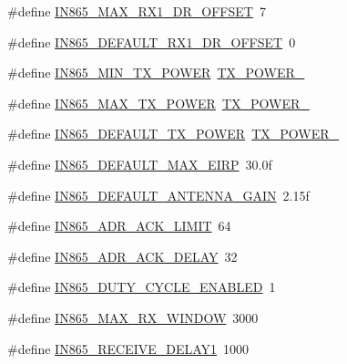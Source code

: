 \begin{DoxyCompactItemize}
\item 
\#define \hyperlink{group__REGIONIN865_ga3211339c60a66ca9f9baad03eb4546d6}{I\+N865\+\_\+\+M\+A\+X\+\_\+\+R\+X1\+\_\+\+D\+R\+\_\+\+O\+F\+F\+S\+ET}~7
\item 
\#define \hyperlink{group__REGIONIN865_ga6bd4f0c33ab266e3e197db4f45131cae}{I\+N865\+\_\+\+D\+E\+F\+A\+U\+L\+T\+\_\+\+R\+X1\+\_\+\+D\+R\+\_\+\+O\+F\+F\+S\+ET}~0
\item 
\#define \hyperlink{group__REGIONIN865_ga91b8f9bdc09d452a2e6bbbad95544245}{I\+N865\+\_\+\+M\+I\+N\+\_\+\+T\+X\+\_\+\+P\+O\+W\+ER}~\hyperlink{group__REGION_gac9747c69350f34d485c3134e5a57655b}{T\+X\+\_\+\+P\+O\+W\+E\+R\+\_}
\item 
\#define \hyperlink{group__REGIONIN865_ga6bd515d7c4fbad47210702da1d9396a3}{I\+N865\+\_\+\+M\+A\+X\+\_\+\+T\+X\+\_\+\+P\+O\+W\+ER}~\hyperlink{group__REGION_gab33618449f2a573142c463ab071ef8ed}{T\+X\+\_\+\+P\+O\+W\+E\+R\+\_}
\item 
\#define \hyperlink{group__REGIONIN865_gafdbc3865fbf7785cdee80410d5769f84}{I\+N865\+\_\+\+D\+E\+F\+A\+U\+L\+T\+\_\+\+T\+X\+\_\+\+P\+O\+W\+ER}~\hyperlink{group__REGION_gab33618449f2a573142c463ab071ef8ed}{T\+X\+\_\+\+P\+O\+W\+E\+R\+\_}
\item 
\#define \hyperlink{group__REGIONIN865_gababb492eaab442a1921c6e337b76eeb8}{I\+N865\+\_\+\+D\+E\+F\+A\+U\+L\+T\+\_\+\+M\+A\+X\+\_\+\+E\+I\+RP}~30.\+0f
\item 
\#define \hyperlink{group__REGIONIN865_ga7d32a4c9d01cd9a98f4066a659b22a9f}{I\+N865\+\_\+\+D\+E\+F\+A\+U\+L\+T\+\_\+\+A\+N\+T\+E\+N\+N\+A\+\_\+\+G\+A\+IN}~2.\+15f
\item 
\#define \hyperlink{group__REGIONIN865_ga7ac52736577da9a1671230aad8390229}{I\+N865\+\_\+\+A\+D\+R\+\_\+\+A\+C\+K\+\_\+\+L\+I\+M\+IT}~64
\item 
\#define \hyperlink{group__REGIONIN865_ga54e9b88a690a69b222c4a3af1bd3d825}{I\+N865\+\_\+\+A\+D\+R\+\_\+\+A\+C\+K\+\_\+\+D\+E\+L\+AY}~32
\item 
\#define \hyperlink{group__REGIONIN865_gac14e67dc121c84da15e74f9ba87a45eb}{I\+N865\+\_\+\+D\+U\+T\+Y\+\_\+\+C\+Y\+C\+L\+E\+\_\+\+E\+N\+A\+B\+L\+ED}~1
\item 
\#define \hyperlink{group__REGIONIN865_gaf29bf6c8c2906dc70b8b795b7168523e}{I\+N865\+\_\+\+M\+A\+X\+\_\+\+R\+X\+\_\+\+W\+I\+N\+D\+OW}~3000
\item 
\#define \hyperlink{group__REGIONIN865_ga7c1655393a8e012682387275d85f9db8}{I\+N865\+\_\+\+R\+E\+C\+E\+I\+V\+E\+\_\+\+D\+E\+L\+A\+Y1}~1000
\item 

\end{DoxyCompactItemize}
